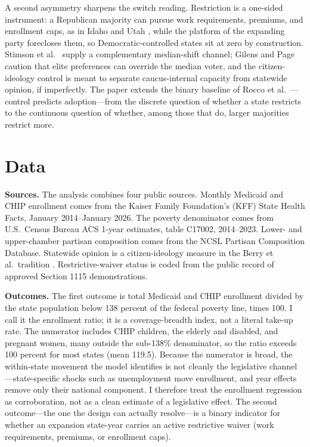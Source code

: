 \documentclass[9pt,twoside]{pnas-new}
\begin{document}
A second asymmetry sharpens the switch reading. Restriction is a one-sided instrument: a Republican majority can pursue work requirements, premiums, and enrollment caps, as in Idaho and Utah \cite{jarlenski2020}, while the platform of the expanding party forecloses them, so Democratic-controlled states sit at zero by construction. Stimson et al.\ \cite{stimson1995} supply a complementary median-shift channel; Gilens and Page \cite{gilenspage2014} caution that elite preferences can override the median voter, and the citizen-ideology control is meant to separate caucus-internal capacity from statewide opinion, if imperfectly. The paper extends the binary baseline of Rocco et al.\ \cite{rocco2020}---control predicts adoption---from the discrete question of whether a state restricts to the continuous question of whether, among those that do, larger majorities restrict more.

\section*{Data}

\textbf{Sources.} The analysis combines four public sources. Monthly Medicaid and CHIP enrollment comes from the Kaiser Family Foundation's (KFF) State Health Facts, January 2014--January 2026. The poverty denominator comes from U.S.\ Census Bureau ACS 1-year estimates, table C17002, 2014--2023. Lower- and upper-chamber partisan composition comes from the NCSL Partisan Composition Database. Statewide opinion is a citizen-ideology measure in the Berry et al.\ tradition \cite{berry1998}. Restrictive-waiver status is coded from the public record of approved Section 1115 demonstrations.

\textbf{Outcomes.} The first outcome is total Medicaid and CHIP enrollment divided by the state population below 138 percent of the federal poverty line, times 100. I call it the enrollment ratio; it is a coverage-breadth index, not a literal take-up rate. The numerator includes CHIP children, the elderly and disabled, and pregnant women, many outside the sub-138\% denominator, so the ratio exceeds 100 percent for most states (mean 119.5). Because the numerator is broad, the within-state movement the model identifies is not cleanly the legislative channel---state-specific shocks such as unemployment move enrollment, and year effects remove only their national component. I therefore treat the enrollment regression as corroboration, not as a clean estimate of a legislative effect. The second outcome---the one the design can actually resolve---is a binary indicator for whether an expansion state-year carries an active restrictive waiver (work requirements, premiums, or enrollment caps).
\end{document}
